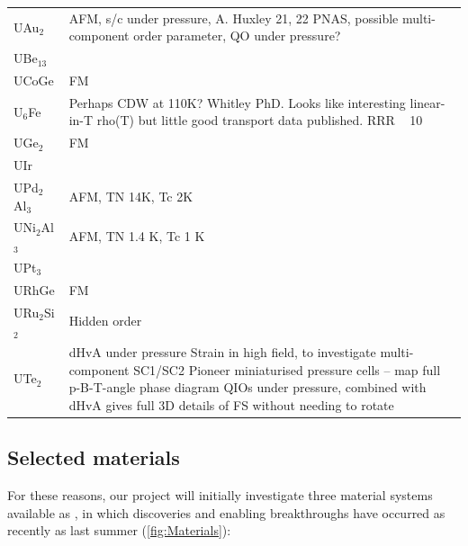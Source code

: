 \begin{table}
  \begin{tabular}{l L{5.5cm}}
    UAu$_2$ &
    AFM, s/c under pressure, A. Huxley 21, 22 PNAS, possible multi-component order parameter, QO under pressure?
    \\

    UBe$_{13}$ & \\
    
    UCoGe & 
    FM \\
    
    U$_6$Fe & 
    Perhaps CDW at 110K? Whitley PhD. Looks like interesting linear-in-T rho(T) but little good transport data published. RRR ~ 10 \\
    
    UGe$_2$  & FM \\
    UIr & \\
    UPd$_2$Al$_3$ & 
    AFM, TN 14K, Tc 2K
    \\

    UNi$_2$Al$_3$ &
    AFM, TN 1.4 K, Tc 1 K
    \\

    UPt$_3$ & \\
  
    URhGe & 
    FM
    \\

    URu$_2$Si$_2$ & 
    Hidden order \\
  
    UTe$_2$ & 
      dHvA under pressure
      Strain in high field, to investigate multi-component SC1/SC2
      Pioneer miniaturised pressure cells – map full p-B-T-angle phase diagram 
      QIOs under pressure, combined with dHvA gives full 3D details of FS without needing to rotate \\
  \end{tabular}
\end{table}

  \subsection*{Selected materials}
  \noindent
  For these reasons, our project will initially investigate three material systems available as , in which discoveries and enabling breakthroughs %
  have occurred as recently as last summer (\autoref{fig:Materials}):
  
